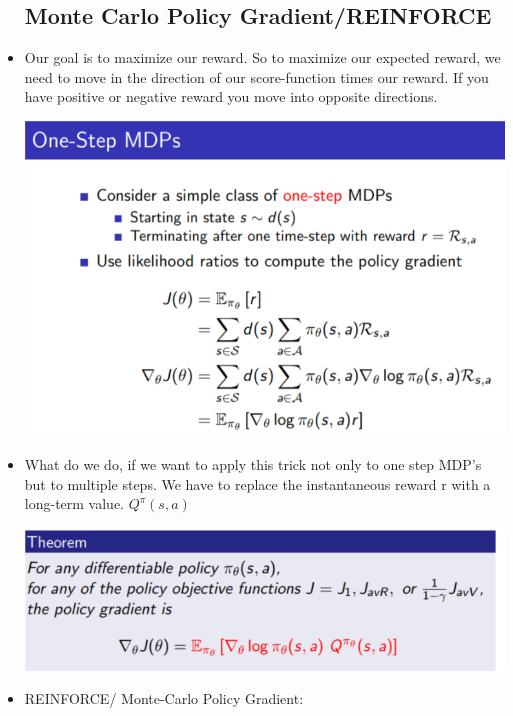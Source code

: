 \documentclass[a4paper]{article}
\begin{document}
\begin{itemize}
    \subsection{Monte Carlo Policy Gradient/REINFORCE}
    \item Our goal is to maximize our reward. So to maximize our expected reward, we need to move in the direction of our score-function times our reward. If you have positive or negative reward you move into opposite directions. 
     \begin{center}
    \includegraphics[width = \textwidth]{images/onestep.png}
    \end{center}
    \item What do we do, if we want to apply this trick not only to one step MDP's but to multiple steps. We have to replace the instantaneous reward r with a long-term value. $Q^{\pi}(s,a)$
     \begin{center}
    \includegraphics[width = \textwidth]{images/policygrad.png}
    \end{center}
    \item REINFORCE/ Monte-Carlo Policy Gradient: 
      \begin{center}

\end{center}
\end{itemize}
\end{document}
